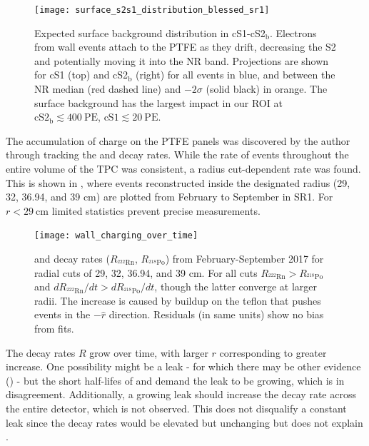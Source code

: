\begin{figure}
\centering
\texttt{[image: surface\_s2s1\_distribution\_blessed\_sr1]}
\caption{Expected surface background distribution in cS1-cS2$_{\mathrm{b}}$.  Electrons from wall events attach to the PTFE as they drift,
decreasing the S2 and potentially moving it into the NR band.  Projections are
shown for cS1 (top) and cS2$_{\mathrm{b}}$ (right) for all events in blue, and between the NR median (red dashed line) and
$-2 \sigma$ (solid black) in orange.  The surface background has the largest impact in our ROI at
$\mathrm{cS2_{\mathrm{b}}} \lesssim 400\ \mathrm{PE}$, $\mathrm{cS1} \lesssim 20\ \mathrm{PE}$.}
\label{fig:backgrounds_detector_materials_bands}
\end{figure}

The accumulation of charge on the PTFE panels was discovered by the author through tracking the  and  decay
rates.  While the rate of events throughout the entire volume of the TPC was consistent, a radius cut-dependent rate was found.  This
is shown in , where events reconstructed inside the designated radius (29, 32, 36.94, and 39 cm) are
plotted from February to September in SR1.  For $r < 29\ \mathrm{cm}$ limited statistics prevent precise measurements.

\begin{figure}
\centering
\texttt{[image: wall\_charging\_over\_time]}
\caption{ and  decay rates ($R_{\mathrm{^{222}Rn}}$, $R_{\mathrm{^{218}Po}}$) from February-September 2017 for
radial cuts of 29, 32, 36.94, and 39 cm.  For all cuts $R_{\mathrm{^{222}Rn}} > R_{\mathrm{^{218}Po}}$ and
$dR_{\mathrm{^{222}Rn}}/dt > dR_{\mathrm{^{218}Po}}/dt$, though the latter converge at larger radii.  The increase is caused by \electron
buildup on the teflon that pushes events in the $-\hat{r}$ direction.  Residuals (in same units) show no bias from fits.}
\label{fig:backgrounds_wall_charge}
\end{figure}

The decay rates $R$ grow over time, with larger $r$ corresponding to greater increase.  One possibility might be a leak - for
which there may be other evidence () - but the
short half-lifes of  and  demand the leak to be growing, which is in disagreement.  Additionally, a growing
leak should increase the decay rate across the entire detector, which is not observed.  This does not disqualify a constant leak since
the decay rates would be elevated but unchanging but does not explain .


